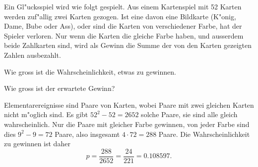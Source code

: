 Ein Gl"ucksspiel wird wie folgt gespielt. Aus einem Kartenspiel
mit 52 Karten werden zuf"allig zwei Karten gezogen. Ist eine
davon eine Bildkarte (K"onig, Dame, Bube oder Ass), oder sind die
Karten von verschiedener Farbe, hat der Spieler verloren. Nur wenn
die Karten die gleiche Farbe haben, und ausserdem beide Zahlkarten
sind, wird als Gewinn die Summe der von den Karten gezeigten Zahlen
ausbezahlt.
\begin{teilaufgaben}
\item Wie gross ist die Wahrscheinlichkeit, etwas zu gewinnen.
\item Wie gross ist der erwartete Gewinn?
\end{teilaufgaben}

\begin{loesung}
\begin{teilaufgaben}
\item
Elementarereignisse sind Paare von Karten, wobei Paare mit zwei
gleichen Karten nicht m"oglich sind. Es gibt $52^2-52=2652$ solche
Paare, sie sind alle gleich wahrscheinlich. Nur die Paare mit gleicher
Farbe gewinnen, von jeder Farbe sind dies $9^2-9=72$ Paare, also
insgesamt $4\cdot 72=288$ Paare. Die Wahrscheinlichkeit zu gewinnen
ist daher
\[
p=\frac{288}{2652}=\frac{24}{221}=0.108597.
\]


\end{teilaufgaben}
\end{loesung}
